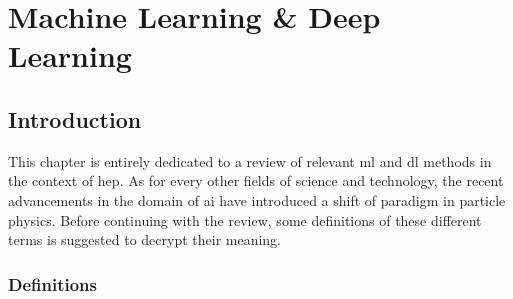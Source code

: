 \chapter{\color{oxfordblue} Machine Learning \& Deep Learning}
\ChapFrame

\section{Introduction}
This chapter is entirely dedicated to a review of relevant \gls{ml} and \gls{dl} methods in the context of \gls{hep}. As for every other fields of science and technology, the recent advancements in the domain of \gls{ai} have introduced a shift of paradigm in particle physics. Before continuing with the review, some definitions of these different terms is suggested to decrypt their meaning.

\subsection{Definitions}
